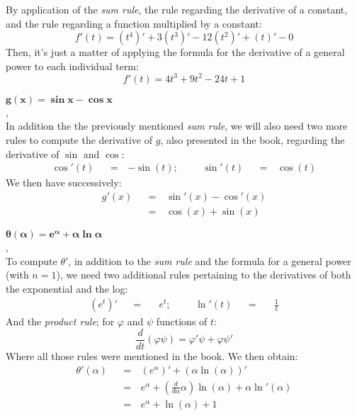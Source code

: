 \documentclass[solutions.tex]{subfiles}
\begin{document}
By application of the \textit{sum rule}, the rule regarding the derivative
of a constant, and the rule regarding a function multiplied by a constant:
\[
	f'(t) = (t^4)' + 3(t^3)'-12(t^2)'+(t)'-0
\]
Then, it's just a matter of applying the formula for the derivative of a general
power to each individual term:
\[
	\boxed{f'(t) = 4t^3 + 9t^2-24t+1}
\]

\hr
$\bm{g(x) = \sin x - \cos x}$ \\, \\
In addition the the previously mentioned \textit{sum rule}, we will also
need two more rules to compute the derivative of $g$, also presented in
the book, regarding the derivative of $\sin$ and $\cos$:
\begin{equation*} \begin{aligned}
	\cos'(t) &&=\,& -\sin(t); &&&
	\sin'(t) &&=\,& \cos(t)
\end{aligned} \end{equation*}
We then have successively:
\begin{equation*} \begin{aligned}
	g'(x) &&=\,& \sin'(x)-\cos'(x) \\
	~ &&=\,& \boxed{\cos(x)+\sin(x)}
\end{aligned} \end{equation*}

\hr
$\bm{\theta(\alpha) = e^\alpha + \alpha\ln\alpha}$ \\, \\
To compute $\theta'$, in addition to the \textit{sum rule}
and the formula for a general power (with $n=1$), we need two
additional rules pertaining to the derivatives of both the
exponential and the log:
\begin{equation*} \begin{aligned}
	(e^t)' &&=\quad& e^t; &&&
	\ln'(t) &&=\quad& \frac{1}{t}
\end{aligned} \end{equation*}
And the \textit{product rule}; for $\varphi$ and $\psi$ functions
of $t$:
\[
	\frac{d}{dt}(\varphi\psi) = \varphi'\psi + \varphi\psi'
\]
Where all those rules were mentioned in the book. We then obtain:
\begin{equation*} \begin{aligned}
	\theta'(\alpha) &&=\,& (e^\alpha)'+(\alpha\ln(\alpha))' \\
	~ &&=\,& e^\alpha+(\frac{d}{d\alpha}\alpha)\ln(\alpha)+\alpha \ln'(\alpha) \\
	~ &&=\,& \boxed{e^\alpha+\ln(\alpha)+1}
\end{aligned} \end{equation*}
\end{document}
